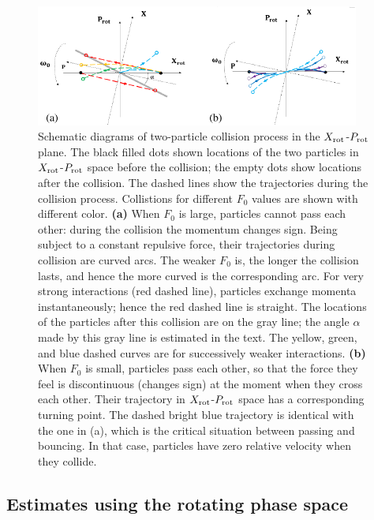 \documentclass[a4paper, onecolumn]{revtex4-1}
\begin{document}
\begin{figure}[tbph]
\includegraphics[width=0.95\textwidth]{ZhiyuPictures/phase-space_collisioncartoons_01.pdf}
\caption{Schematic diagrams of two-particle collision process in the $X_{\rm rot}$-$P_{\rm rot}$
  plane. 
%
The black filled dots shown locations of the two particles in $X_{\rm rot}$-$P_{\rm rot}$ space
before the collision; the empty dots show locations after the collision.  The dashed lines show the
trajectories during the collision process.  Collistions for different $F_0$ values are shown with
different color.
%
\textbf{(a)} When $F_0$ is large, particles cannot pass each other: during the collision the
momentum changes sign.  Being subject to a constant repulsive force, their trajectories during
collision are curved arcs.  The weaker $F_0$ is, the longer the collision lasts, and hence the more
curved is the corresponding arc.
%
For very strong interactions (red dashed line), particles exchange momenta instantaneously; hence
the red dashed line is straight.  The locations of the particles after this collision are on the
gray line; the angle $\alpha$ made by this gray line is estimated in the text.  The yellow, green,
and blue dashed curves are for successively weaker interactions.  \textbf{(b)} When $F_0$ is small,
particles pass each other, so that the force they feel is discontinuous (changes sign) at the moment
when they cross each other.  Their trajectory in $X_{\rm rot}$-$P_{\rm rot}$ space has a
corresponding turning point.  The dashed bright blue trajectory is identical with the one in (a),
which is the critical situation between passing and bouncing. In that case, particles have zero
relative velocity when they collide. }
\label{fig:Breathingfrequency3}
\end{figure}


\subsection{Estimates using the rotating phase space}
\end{document}
